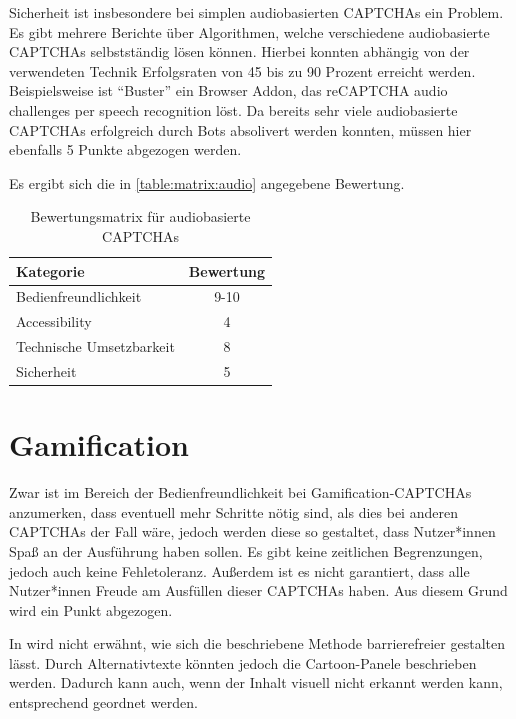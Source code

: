 Sicherheit ist insbesondere bei simplen audiobasierten CAPTCHAs ein Problem.
Es gibt mehrere Berichte über Algorithmen, welche verschiedene audiobasierte CAPTCHAs selbstständig lösen können.
Hierbei konnten abhängig von der verwendeten Technik Erfolgsraten von 45 bis zu 90 Prozent erreicht werden.
Beispielsweise ist “Buster” ein Browser Addon, das reCAPTCHA audio challenges per speech recognition löst.
Da bereits sehr viele audiobasierte CAPTCHAs erfolgreich durch Bots absolivert werden konnten,
müssen hier ebenfalls 5 Punkte abgezogen werden.

Es ergibt sich die in \autoref{table:matrix:audio} angegebene Bewertung.

\begin{table}[h!]
    \caption{Bewertungsmatrix für audiobasierte CAPTCHAs}
    \begin{center}
        \begin{tabular}{l|c}
            Kategorie                       & Bewertung \\\hline
            Bedienfreundlichkeit            & 9-10         \\
            Accessibility                   & 4        \\
            Technische Umsetzbarkeit        & 8         \\
            Sicherheit                      & 5         
        \end{tabular}
    \end{center}
    \label{table:matrix:audio}
\end{table}

\section{Gamification}
Zwar ist im Bereich der Bedienfreundlichkeit bei Gamification-CAPTCHAs anzumerken, 
dass eventuell mehr Schritte nötig sind, als dies bei anderen CAPTCHAs der Fall wäre,
jedoch werden diese so gestaltet, dass Nutzer*innen Spaß an der Ausführung haben sollen. 
Es gibt keine zeitlichen Begrenzungen, jedoch auch keine Fehletoleranz.
Außerdem ist es nicht garantiert, dass alle Nutzer*innen Freude am Ausfüllen dieser CAPTCHAs haben.
Aus diesem Grund wird ein Punkt abgezogen.

In \cite{gamified} wird nicht erwähnt, wie sich die beschriebene Methode barrierefreier gestalten lässt.
Durch Alternativtexte könnten jedoch die Cartoon-Panele beschrieben werden.
Dadurch kann auch, wenn der Inhalt visuell nicht erkannt werden kann, entsprechend geordnet werden.

